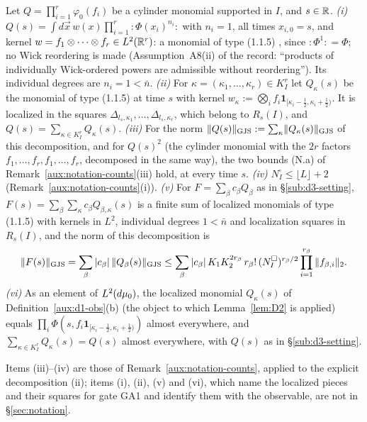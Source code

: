 \begin{auxlemma}\label{aux:d3-cyl}
Let $Q=\prod_{i=1}^r\varphi_0(f_i)$ be a cylinder monomial supported in $I$, and $s\in\mathbb{R}$.
\emph{(i)} $Q(s)=\int d\vec x\,w(x)\prod_{i=1}^r{:}\Phi(x_i)^{n_i}{:}$ with $n_i=1$, all times
$x_{i,0}=s$, and kernel $w=f_1\otimes\dots\otimes f_r\in L^2(\mathbb{R}^r)$: a monomial of type (1.1.5)
\cite[p.~593]{GJS}, since ${:}\Phi^1{:}=\Phi$; no Wick reordering is made (Assumption~A8(ii) of the
record: ``products of individually Wick-ordered powers are admissible without reordering'').
Its individual degrees are $n_i=1<\bar n$.
\emph{(ii)} For $\kappa=(\kappa_1,\dots,\kappa_r)\in K_I^r$ let $Q_\kappa(s)$ be the monomial of
type (1.1.5) at time $s$ with kernel
$w_\kappa:=\bigotimes_i f_i\mathbf 1_{[\kappa_i-\frac12,\kappa_i+\frac12)}$.  It is localized in
the squares $\Delta_{l_s,\kappa_1},\dots,\Delta_{l_s,\kappa_r}$, which belong to $R_s(I)$, and
$Q(s)=\sum_{\kappa\in K_I^r}Q_\kappa(s)$.
\emph{(iii)} For the norm $\lVert Q(s)\rVert_{\mathrm{GJS}}:=\sum_\kappa\lVert Q_\kappa(s)\rVert_{\mathrm{GJS}}$ of this decomposition, and for
$Q(s)^2$ (the cylinder monomial with the $2r$ factors $f_1,\dots,f_r,f_1,\dots,f_r$, decomposed
in the same way), the two bounds (N.a) of Remark~\ref{aux:notation-counts}(iii) hold, at every
time $s$.
\emph{(iv)} $N^\square_I\le\lfloor L\rfloor+2$ (Remark~\ref{aux:notation-counts}(i)).
\emph{(v)} For $F=\sum_\beta c_\beta Q_\beta$ as in \S\ref{sub:d3-setting},
$F(s)=\sum_\beta\sum_\kappa c_\beta Q_{\beta,\kappa}(s)$ is a finite sum of localized monomials
of type (1.1.5) with kernels in $L^2$, individual degrees $1<\bar n$ and localization squares in
$R_s(I)$, and the norm of this decomposition is
\[
 \lVert F(s)\rVert_{\mathrm{GJS}}=\sum_\beta|c_\beta|\,\lVert Q_\beta(s)\rVert_{\mathrm{GJS}}
 \le\sum_\beta|c_\beta|\,K_1K_2^{2r_\beta}\,r_\beta!\,(N^\square_I)^{r_\beta/2}
 \prod_{i=1}^{r_\beta}\|f_{\beta,i}\|_2 .
\]
\emph{(vi)} As an element of $L^2(d\mu_0)$, the localized monomial $Q_\kappa(s)$ of
Definition~\ref{aux:d1-obs}(b) (the object to which Lemma~\ref{lem:D2} is applied) equals
$\prod_i\Phi(s,f_i\mathbf 1_{[\kappa_i-\frac12,\kappa_i+\frac12)})$ almost everywhere, and
$\sum_{\kappa\in K_I^r}Q_\kappa(s)=Q(s)$ almost everywhere, with $Q(s)$ as in
\S\ref{sub:d3-setting}.
\end{auxlemma}

Items (iii)--(iv) are those of Remark~\ref{aux:notation-counts}, applied to the explicit
decomposition (ii); items (i), (ii), (v) and (vi), which name the localized pieces and their
squares for gate GA1 and identify them with the observable, are not in \S\ref{sec:notation}.

